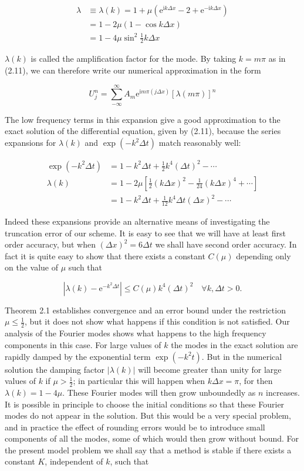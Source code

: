 \documentclass[10pt]{article}
\begin{document}
\[
\begin{aligned}
\lambda & \equiv \lambda(k)=1+\mu\left(\mathrm{e}^{\mathrm{i} k \Delta x}-2+\mathrm{e}^{-\mathrm{i} k \Delta x}\right) \\
& =1-2 \mu(1-\cos k \Delta x) \\
& =1-4 \mu \sin ^{2} \frac{1}{2} k \Delta x
\end{aligned}
\]

\(\lambda(k)\) is called the amplification factor for the mode. By taking \(k=m \pi\) as in (2.11), we can therefore write our numerical approximation in the form

\[
U_{j}^{n}=\sum_{-\infty}^{\infty} A_{m} \mathrm{e}^{\mathrm{i} m \pi(j \Delta x)}[\lambda(m \pi)]^{n}
\]

The low frequency terms in this expansion give a good approximation to the exact solution of the differential equation, given by (2.11), because the series expansions for \(\lambda(k)\) and \(\exp \left(-k^{2} \Delta t\right)\) match reasonably well:

\[
\begin{aligned}
\exp \left(-k^{2} \Delta t\right) & =1-k^{2} \Delta t+\frac{1}{2} k^{4}(\Delta t)^{2}-\cdots \\
\lambda(k) & =1-2 \mu\left[\frac{1}{2}(k \Delta x)^{2}-\frac{1}{24}(k \Delta x)^{4}+\cdots\right] \\
& =1-k^{2} \Delta t+\frac{1}{12} k^{4} \Delta t(\Delta x)^{2}-\cdots
\end{aligned}
\]

Indeed these expansions provide an alternative means of investigating the truncation error of our scheme. It is easy to see that we will have at least first order accuracy, but when \((\Delta x)^{2}=6 \Delta t\) we shall have second order accuracy. In fact it is quite easy to show that there exists a constant \(C(\mu)\) depending only on the value of \(\mu\) such that

\[
\left|\lambda(k)-\mathrm{e}^{-k^{2} \Delta t}\right| \leq C(\mu) k^{4}(\Delta t)^{2} \quad \forall k, \Delta t>0 .
\]

Theorem 2.1 establishes convergence and an error bound under the restriction \(\mu \leq \frac{1}{2}\), but it does not show what happens if this condition is not satisfied. Our analysis of the Fourier modes shows what happens to the high frequency components in this case. For large values of \(k\) the modes in the exact solution are rapidly damped by the exponential term \(\exp \left(-k^{2} t\right)\). But in the numerical solution the damping factor \(|\lambda(k)|\) will become greater than unity for large values of \(k\) if \(\mu>\frac{1}{2}\); in particular this will happen when \(k \Delta x=\pi\), for then \(\lambda(k)=1-4 \mu\). These Fourier modes will then grow unboundedly as \(n\) increases. It is possible in principle to choose the initial conditions so that these Fourier modes do not appear in the solution. But this would be a very special problem, and in practice the effect of rounding errors would be to introduce small\\
components of all the modes, some of which would then grow without bound. For the present model problem we shall say that a method is stable if there exists a constant \(K\), independent of \(k\), such that
\end{document}
